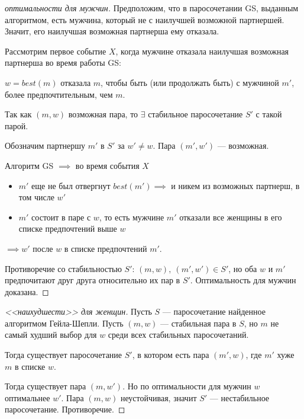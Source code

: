 \begin{proof}[ оптимальности для мужчин]

    Предположим, что в паросочетании GS, выданным алгоритмом, есть мужчина, который не с наилучшей возможной партнершей. Значит, его наилучшая возможная партнерша ему отказала.

    Рассмотрим первое событие $X$, когда мужчине отказала наилучшая возможная партнерша во время работы GS:

    $w = best(m)$ отказала $m$, чтобы быть (или продолжать быть) с мужчиной $m'$, более предпочтительным, чем $m$.

    Так как $(m, w)$ возможная пара, то $\exists$ стабильное паросочетание $S'$ с такой парой.

    Обозначим партнершу $m'$ в $S'$ за $w' \neq w$. Пара $(m', w')$ --- возможная.

    Алгоритм GS $\implies$ во время события $X$
    \begin{itemize}
        \item $m'$ еще не был отвергнут $best(m') \implies$ и никем из возможных партнерш, в том числе $w'$
       
        \item $m'$ состоит в паре с $w$, то есть мужчине $m'$ отказали все женщины в его списке предпочтений выше $w$
    \end{itemize}
    
    $\implies w'$ после $w$ в списке предпочтений $m'$.
    
    Противоречие со стабильностью $S'$: $(m, w),~(m', w') \in S'$, но оба $w$ и $m'$ предпочитают друг друга относительно их пар в $S'$. Оптимальность для мужчин доказана.
\end{proof}

\begin{proof} [ <<наихудшести>> для женщин]

    Пусть $S$ --- паросочетание найденное алгоритмом Гейла-Шепли. Пусть $(m, w)$ --- стабильная пара в $S$, но $m$ не самый худший выбор для $w$ среди всех стабильных паросочетаний. 
    
    Тогда существует паросочетание $S'$, в котором есть пара $(m', w)$, где $m'$ хуже $m$ в списке $w$.

    Тогда существует пара $(m, w')$. Но по оптимальности для мужчин $w$ оптимальнее $w'$. Пара $(m, w)$ неустойчивая, значит $S'$ --- нестабильное паросочетание. Противоречие.
    
\end{proof}